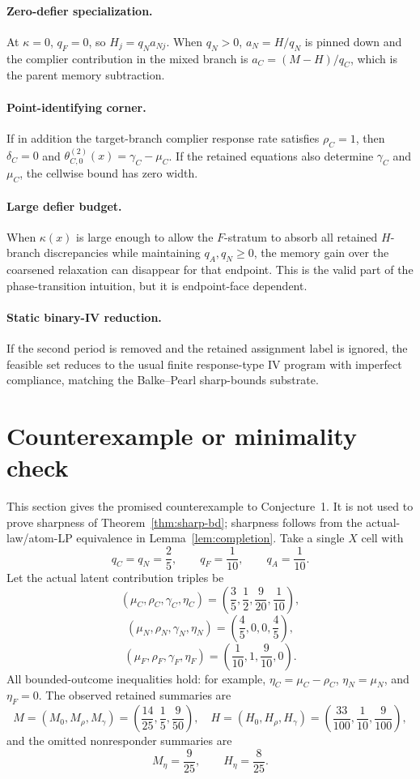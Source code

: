 \documentclass[11pt]{article}
\theoremstyle{definition}
\theoremstyle{plain}
\theoremstyle{remark}
\begin{document}
\paragraph{Zero-defier specialization.}
At \(\kappa=0\), \(q_F=0\), so \(H_j=q_Na_{Nj}\).
When \(q_N>0\), \(a_N=H/q_N\) is pinned down and the complier contribution in the mixed branch is \(a_C=(M-H)/q_C\), which is the parent memory subtraction.

\paragraph{Point-identifying corner.}
If in addition the target-branch complier response rate satisfies \(\rho_C=1\), then \(\delta_C=0\) and
\(\theta_{C,0}^{(2)}(x)=\gamma_C-\mu_C\).
If the retained equations also determine \(\gamma_C\) and \(\mu_C\), the cellwise bound has zero width.

\paragraph{Large defier budget.}
When \(\kappa(x)\) is large enough to allow the \(F\)-stratum to absorb all retained \(H\)-branch discrepancies while maintaining \(q_A,q_N\ge0\), the memory gain over the coarsened relaxation can disappear for that endpoint.
This is the valid part of the phase-transition intuition, but it is endpoint-face dependent.

\paragraph{Static binary-IV reduction.}
If the second period is removed and the retained assignment label is ignored, the feasible set reduces to the usual finite response-type IV program with imperfect compliance, matching the Balke--Pearl sharp-bounds substrate.

\section{Counterexample or minimality check}\label{sec:counterexample}
This section gives the promised counterexample to Conjecture~1.
It is not used to prove sharpness of Theorem~\ref{thm:sharp-bd}; sharpness follows from the actual-law/atom-LP equivalence in Lemma~\ref{lem:completion}.
Take a single \(X\) cell with
\[
q_C=q_N=\frac25,\qquad q_F=\frac1{10},\qquad q_A=\frac1{10}.
\]
Let the actual latent contribution triples be
\[
(\mu_C,\rho_C,\gamma_C,\eta_C)=\left(\frac35,\frac12,\frac9{20},\frac1{10}\right),
\]
\[
(\mu_N,\rho_N,\gamma_N,\eta_N)=\left(\frac45,0,0,\frac45\right),
\]
\[
(\mu_F,\rho_F,\gamma_F,\eta_F)=\left(\frac1{10},1,\frac9{10},0\right).
\]
All bounded-outcome inequalities hold: for example, \(\eta_C=\mu_C-\rho_C\), \(\eta_N=\mu_N\), and \(\eta_F=0\).
The observed retained summaries are
\[
M=(M_0,M_\rho,M_\gamma)=\left(\frac{14}{25},\frac15,\frac9{50}\right),
\quad
H=(H_0,H_\rho,H_\gamma)=\left(\frac{33}{100},\frac1{10},\frac9{100}\right),
\]
and the omitted nonresponder summaries are
\[
M_\eta=\frac9{25},\qquad H_\eta=\frac8{25}.
\]
\end{document}
